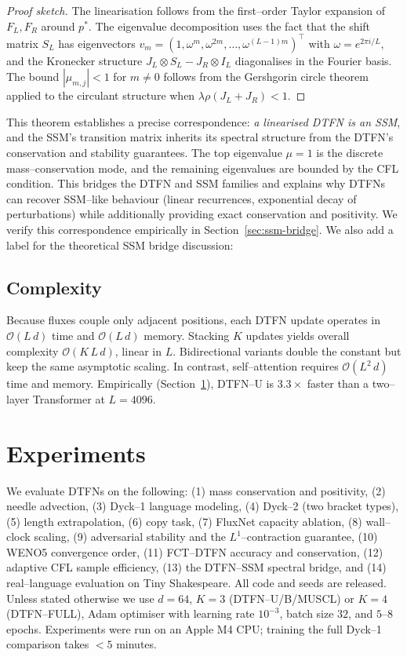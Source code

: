 \documentclass[10pt]{article}
\theoremstyle{definition}
\theoremstyle{remark}
\begin{document}
\begin{proof}[Proof sketch]
  The linearisation follows from the first--order Taylor expansion of
  $F_L, F_R$ around $p^*$.  The eigenvalue decomposition uses the
  fact that the shift matrix $S_L$ has eigenvectors $v_m = (1,
  \omega^m, \omega^{2m}, \dots, \omega^{(L-1)m})^\top$ with
  $\omega = e^{2\pi i/L}$, and the Kronecker structure
  $J_L \otimes S_L - J_R \otimes I_L$ diagonalises in the Fourier
  basis.  The bound $|\mu_{m,j}| < 1$ for $m \ne 0$ follows from the
  Gershgorin circle theorem applied to the circulant structure when
  $\lambda \rho(J_L + J_R) < 1$.
\end{proof}

This theorem establishes a precise correspondence: \emph{a linearised
DTFN is an SSM}, and the SSM's transition matrix inherits its
spectral structure from the DTFN's conservation and stability
guarantees.  The top eigenvalue $\mu = 1$ is the discrete
mass--conservation mode, and the remaining eigenvalues are bounded
by the CFL condition.  This bridges the DTFN and SSM families and
explains why DTFNs can recover SSM--like behaviour (linear recurrences,
exponential decay of perturbations) while additionally providing
exact conservation and positivity.  We verify this correspondence
empirically in Section~\ref{sec:ssm-bridge}.  We also add a label
for the theoretical SSM bridge discussion:
\label{sec:ssm-theory}

\subsection{Complexity}
\label{sec:complexity}

Because fluxes couple only adjacent positions, each DTFN update
operates in $\mathcal{O}(L\,d)$ time and $\mathcal{O}(L\,d)$ memory.
Stacking $K$ updates yields overall complexity $\mathcal{O}(K\,L\,d)$,
linear in $L$.  Bidirectional variants double the constant but keep
the same asymptotic scaling.  In contrast, self--attention requires
$\mathcal{O}(L^2\,d)$ time and memory.  Empirically
(Section~\ref{sec:experiments}), DTFN--U is $3.3\times$ faster than a
two--layer Transformer at $L=4096$.

\section{Experiments}
\label{sec:experiments}

We evaluate DTFNs on the following: (1) mass conservation and
positivity, (2) needle advection, (3) Dyck--1 language modeling,
(4) Dyck--2 (two bracket types), (5) length extrapolation,
(6) copy task, (7) FluxNet capacity ablation, (8) wall--clock scaling,
(9) adversarial stability and the $L^1$--contraction guarantee,
(10) WENO5 convergence order, (11) FCT--DTFN accuracy and conservation,
(12) adaptive CFL sample efficiency, (13) the DTFN--SSM spectral
bridge, and (14) real--language evaluation on Tiny Shakespeare.
All code and seeds are released.  Unless stated otherwise we use
$d=64$, $K=3$ (DTFN--U/B/MUSCL) or $K=4$ (DTFN--FULL), Adam optimiser
with learning rate $10^{-3}$, batch size $32$, and $5$--$8$ epochs.
Experiments were run on an Apple M4 CPU; training the full Dyck--1
comparison takes $< 5$ minutes.
\end{document}
